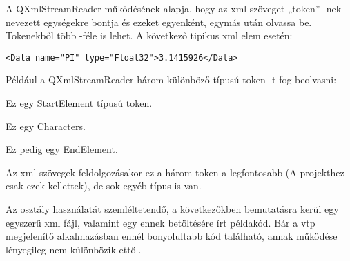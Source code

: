 A {\ttfamily QXmlStreamReader} működésének alapja, 
hogy az xml szöveget „token” -nek nevezett egységekre bontja és ezeket egyenként, 
egymás után olvassa be. 
Tokenekből több -féle is lehet. A következő tipikus xml elem esetén:
\begin{lstlisting}[style=customxml]
<Data name="PI" type="Float32">3.1415926</Data>
\end{lstlisting}
Például a {\ttfamily QXmlStreamReader} három különböző típusú token -t fog beolvasni:
\begin{description}[font=\normalfont\small\ttfamily\space]
\item [<Data name="PI" type="Float32">:] 
Ez egy {\ttfamily StartElement} típusú token.
\item [3.1415926:] 
Ez egy {\ttfamily Characters}.
\item [</Data>:] 
Ez pedig egy {\ttfamily EndElement}.
\end{description}
Az xml szövegek feldolgozásakor ez a három token a legfontosabb 
(A projekthez csak ezek kellettek), de sok egyéb típus is van.

Az osztály használatát szemléltetendő, 
a következőkben bemutatásra kerül egy egyszerű xml fájl, 
valamint egy ennek betöltésére írt példakód. 
Bár a vtp megjelenítő alkalmazásban ennél bonyolultabb kód található, 
annak működése lényegileg nem különbözik ettől.


